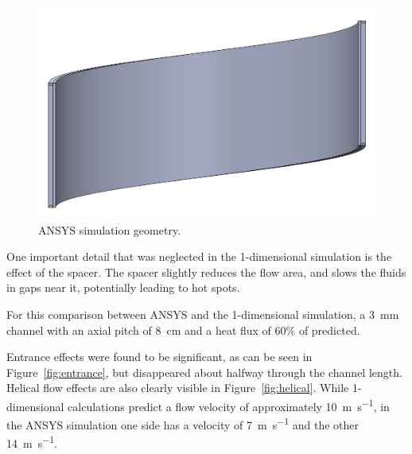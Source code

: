 \documentclass[11pt]{article}
\begin{document}
\begin{figure}[H]
	\centering
  	\includegraphics[width=0.6\linewidth]{solidwork_screenshot}
  	\caption{ANSYS simulation geometry.}
  	\label{fig:ansys_geom}
\end{figure}

One important detail that was neglected in the 1-dimensional simulation is the effect of the spacer. The spacer slightly reduces the flow area, and slows the fluids in gaps near it, potentially leading to hot spots.

For this comparison between ANSYS and the 1-dimensional simulation, a \SI{3}{\milli\meter} channel with an axial pitch of \SI{8}{\centi\meter} and a heat flux of 60\% of predicted.

Entrance effects were found to be significant, as can be seen in Figure~\ref{fig:entrance}, but disappeared about halfway through the channel length. Helical flow effects are also clearly visible in Figure~\ref{fig:helical}. While 1-dimensional calculations predict a flow velocity of approximately \SI{10}{\meter\per\second}, in the ANSYS simulation one side has a velocity of \SI{7}{\meter\per\second} and the other \SI{14}{\meter\per\second}.
\end{document}
